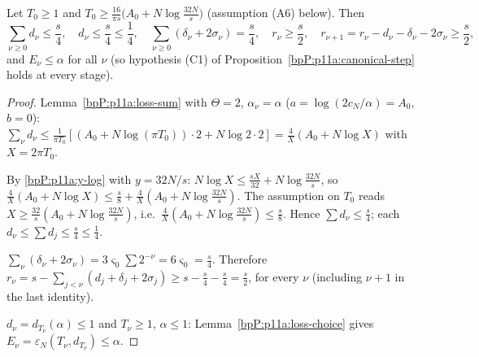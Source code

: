 \begin{lemma}\label{bpP:p11a:strip-budget}
Let $T_0\ge1$ and $T_0\ge\frac{16}{\pi s}\bigl(A_0+N\log\frac{32N}s\bigr)$ (assumption (A6) below). Then
\[\sum_{\nu\ge0}d_\nu\le\frac s4,\quad d_\nu\le\frac s4\le\frac14,\quad\sum_{\nu\ge0}(\delta_\nu+2\sigma_\nu)=\frac s4,\quad r_\nu\ge\frac s2,\quad r_{\nu+1}=r_\nu-d_\nu-\delta_\nu-2\sigma_\nu\ge\frac s2,\]
and $E_\nu\le\alpha$ for all $\nu$ (so hypothesis (C1) of Proposition~\ref{bpP:p11a:canonical-step} holds at every stage).
\end{lemma}
\begin{proof}
\label{stepP:p11a:sb-sum} Lemma~\ref{bpP:p11a:loss-sum} with $\Theta=2$, $\alpha_\nu=\alpha$ ($a=\log(2c_N/\alpha)=A_0$, $b=0$): $\sum_\nu d_\nu\le\frac1{\pi T_0}[(A_0+N\log(\pi T_0))\cdot2+N\log2\cdot2]=\frac4X(A_0+N\log X)$ with $X=2\pi T_0$.

\label{stepP:p11a:sb-solve} By \ref{bpP:p11a:y-log} with $y=32N/s$: $N\log X\le\frac{sX}{32}+N\log\frac{32N}s$, so $\frac4X(A_0+N\log X)\le\frac s8+\frac4X(A_0+N\log\frac{32N}s)$. The assumption on $T_0$ reads $X\ge\frac{32}s(A_0+N\log\frac{32N}s)$, i.e.\ $\frac4X(A_0+N\log\frac{32N}s)\le\frac s8$. Hence $\sum d_\nu\le\frac s4$; each $d_\nu\le\sum d_j\le\frac s4\le\frac14$.

\label{stepP:p11a:sb-strip} $\sum_\nu(\delta_\nu+2\sigma_\nu)=3\varsigma_0\sum2^{-\nu}=6\varsigma_0=\frac s4$. Therefore $r_\nu=s-\sum_{j<\nu}(d_j+\delta_j+2\sigma_j)\ge s-\frac s4-\frac s4=\frac s2$, for every $\nu$ (including $\nu+1$ in the last identity).

\label{stepP:p11a:sb-err} $d_\nu=d_{T_\nu}(\alpha)\le1$ and $T_\nu\ge1$, $\alpha\le1$: Lemma~\ref{bpP:p11a:loss-choice} gives $E_\nu=\varepsilon_N(T_\nu,d_{T_\nu})\le\alpha$.
\end{proof}

